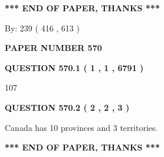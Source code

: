 \documentclass[12pt]{article}
\begin{document}
   
 \vspace{0.2in}
 
   
   
   
   
\vspace{1.0in} 
{\textbf{\large{ *** END OF PAPER, THANKS *** }}} 
   
   
\hspace{1.0in} By: 
 239 ( 416 ,  613 )
   
   
   
   
\newpage 
\setcounter{page}{ 
   570001 } 
   
   
   
   
 {\textbf{ \Large{ PAPER NUMBER  570  }}}
   
   
\vspace{0.2in}
   
   
   
   
   
   
 \vspace{0.2in}
 
 
 
 
   
   
  
\vspace{0.2in}
  
{\textbf{\Large{QUESTION
570.1 
 ( 1 , 1 , 6791 )
}}}
  
  
 
 
\noindent{}

107
 
 
  
\vspace{0.2in}
  
{\textbf{\Large{QUESTION
570.2 
 ( 2 , 2 , 3 )
}}}
  
  
 
 
\noindent{}
 
 
Canada has 10  provinces and 3 territories.
 
 
 
 
   
   
 \vspace{0.2in}
 
   
   
   
   
\vspace{1.0in} 
{\textbf{\large{ *** END OF PAPER, THANKS *** }}} 
   
\end{document}
